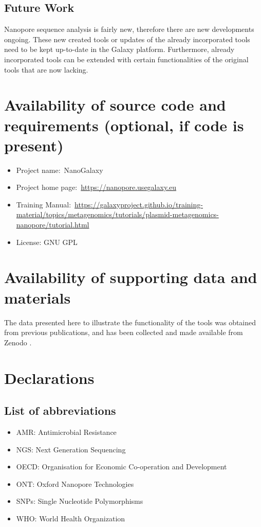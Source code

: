 \documentclass[a4paper,num-refs]{oup-contemporary}
\begin{document}
\subsection{Future Work}
Nanopore sequence analysis is fairly new, therefore there are new developments ongoing. These new created tools or updates of the already incorporated tools need to be kept up-to-date in the Galaxy platform. Furthermore, already incorporated tools can be extended with certain functionalities of the original tools that are now lacking.   

\section{Availability of source code and requirements (optional, if code is present)}

\begin{itemize}
\item Project name:~NanoGalaxy
\item Project home page:~\url{https://nanopore.usegalaxy.eu}
\item Training Manual:~\url{https://galaxyproject.github.io/training-material/topics/metagenomics/tutorials/plasmid-metagenomics-nanopore/tutorial.html}
\item License: GNU GPL
\end{itemize}

\section{Availability of supporting data and materials}

The data presented here to illustrate the functionality of the tools was obtained from previous publications, and has been collected and made available from Zenodo \cite{TODO}.

\section{Declarations}

\subsection{List of abbreviations}

\begin{itemize}
\item AMR: Antimicrobial Resistance
\item NGS: Next Generation Sequencing
\item OECD: Organisation for Economic Co-operation and Development
\item ONT: Oxford Nanopore Technologies
\item SNPs: Single Nucleotide Polymorphisms
\item WHO: World Health Organization
\end{itemize}
\end{document}
